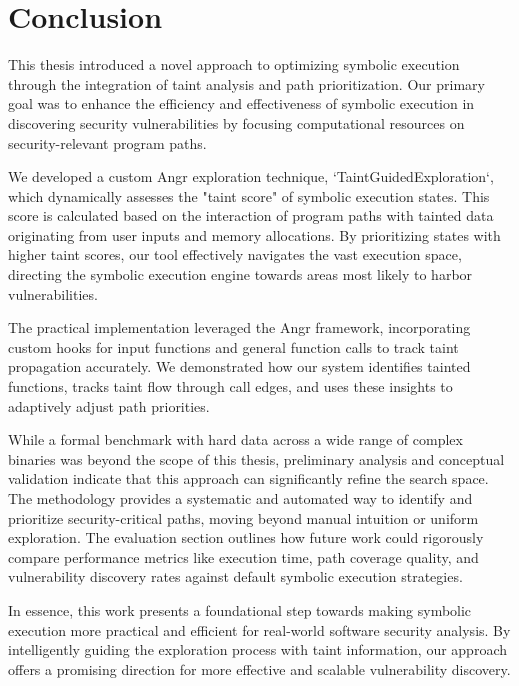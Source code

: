 \chapter{Conclusion}


This thesis introduced a novel approach to optimizing symbolic execution through the integration of taint analysis and path prioritization. Our primary goal was to enhance the efficiency and effectiveness of symbolic execution in discovering security vulnerabilities by focusing computational resources on security-relevant program paths.

We developed a custom Angr exploration technique, `TaintGuidedExploration`, which dynamically assesses the "taint score" of symbolic execution states. This score is calculated based on the interaction of program paths with tainted data originating from user inputs and memory allocations. By prioritizing states with higher taint scores, our tool effectively navigates the vast execution space, directing the symbolic execution engine towards areas most likely to harbor vulnerabilities.

The practical implementation leveraged the Angr framework, incorporating custom hooks for input functions and general function calls to track taint propagation accurately. We demonstrated how our system identifies tainted functions, tracks taint flow through call edges, and uses these insights to adaptively adjust path priorities.

While a formal benchmark with hard data across a wide range of complex binaries was beyond the scope of this thesis, preliminary analysis and conceptual validation indicate that this approach can significantly refine the search space. The methodology provides a systematic and automated way to identify and prioritize security-critical paths, moving beyond manual intuition or uniform exploration. The evaluation section outlines how future work could rigorously compare performance metrics like execution time, path coverage quality, and vulnerability discovery rates against default symbolic execution strategies.

In essence, this work presents a foundational step towards making symbolic execution more practical and efficient for real-world software security analysis. By intelligently guiding the exploration process with taint information, our approach offers a promising direction for more effective and scalable vulnerability discovery.
